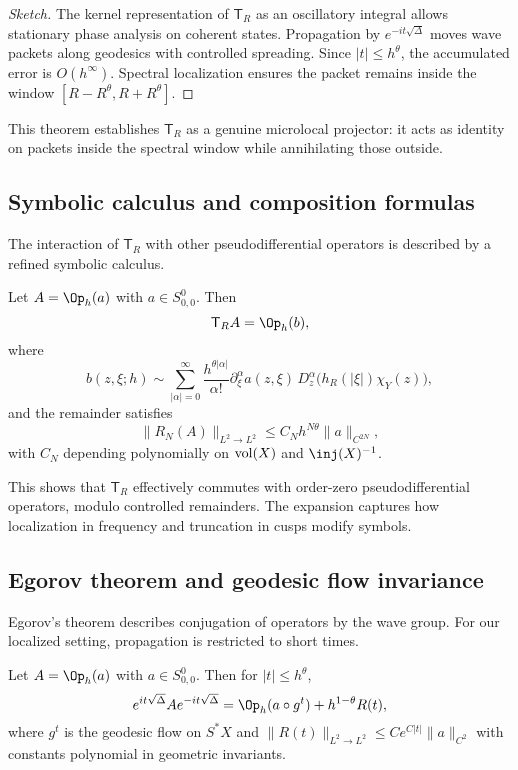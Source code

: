 \begin{proof}[Sketch]
The kernel representation of $\mathsf{T}_R$ as an oscillatory integral allows stationary phase analysis on coherent states. Propagation by $e^{-it\sqrt{\Delta}}$ moves wave packets along geodesics with controlled spreading. Since $|t|\leq h^\theta$, the accumulated error is $O(h^\infty)$. Spectral localization ensures the packet remains inside the window $[R-R^\theta,R+R^\theta]$.
\end{proof}

This theorem establishes $\mathsf{T}_R$ as a genuine microlocal projector: it acts as identity on packets inside the spectral window while annihilating those outside.

\subsection{Symbolic calculus and composition formulas}\label{subsec:micro-calculus}

The interaction of $\mathsf{T}_R$ with other pseudodifferential operators is described by a refined symbolic calculus.

\begin{theorem}\label{thm:composition}
Let $A=\Op_h(a)$ with $a\in S^0_{0,0}$. Then
\[
\mathsf{T}_R A = \Op_h(b),
\]
where
\[
b(z,\xi;h) \sim \sum_{|\alpha|=0}^\infty \frac{h^{\theta|\alpha|}}{\alpha!} \partial_\xi^\alpha a(z,\xi)\, D_z^\alpha \big(h_R(|\xi|)\chi_Y(z)\big),
\]
and the remainder satisfies
\[
\|R_N(A)\|_{L^2\to L^2} \leq C_N h^{N\theta} \|a\|_{C^{2N}},
\]
with $C_N$ depending polynomially on $\operatorname{vol}(X)$ and $\inj(X)^{-1}$.
\end{theorem}

This shows that $\mathsf{T}_R$ effectively commutes with order-zero pseudodifferential operators, modulo controlled remainders. The expansion captures how localization in frequency and truncation in cusps modify symbols.

\subsection{Egorov theorem and geodesic flow invariance}\label{subsec:micro-egorov}

Egorov’s theorem describes conjugation of operators by the wave group. For our localized setting, propagation is restricted to short times.

\begin{theorem}\label{thm:egorov}
Let $A=\Op_h(a)$ with $a\in S^0_{0,0}$. Then for $|t|\leq h^\theta$,
\[
e^{it\sqrt{\Delta}} A e^{-it\sqrt{\Delta}} = \Op_h(a\circ g^t) + h^{1-\theta} R(t),
\]
where $g^t$ is the geodesic flow on $S^*X$ and $\|R(t)\|_{L^2\to L^2}\leq C e^{C|t|}\|a\|_{C^2}$ with constants polynomial in geometric invariants.
\end{theorem}


